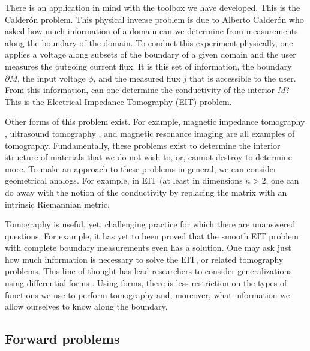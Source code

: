 There is an application in mind with the toolbox we have developed. This is the Calder\'on problem. This physical inverse problem is due to  Alberto Calder\'on who asked how much information of a domain can we determine from measurements along the boundary of the domain. To conduct this experiment physically, one applies a voltage along subsets of the boundary of a given domain and the user measures the outgoing current flux. It is this set of information, the boundary $\partial M$, the input voltage $\phi$, and the measured flux $j$ that is accessible to the user. From this information, can one determine the conductivity of the interior $M$? This is the Electrical Impedance Tomography (EIT) problem. 

Other forms of this problem exist. For example, magnetic impedance tomography , ultrasound tomography , and magnetic resonance imaging are all examples of tomography.  Fundamentally, these problems exist to determine the interior structure of materials that we do not wish to, or, cannot destroy to determine more. To make an approach to these problems in general, we can consider geometrical analogs. For example, in EIT (at least in dimensions $n>2$, one can do away with the notion of the conductivity by replacing the matrix with an intrinsic Riemannian metric. 

Tomography is useful, yet, challenging practice for which there are unanswered questions. For example, it has yet to been proved that the smooth EIT problem with complete boundary measurements even has a solution.  One may ask just how much information is necessary to solve the EIT, or related tomography problems. This line of thought has lead researchers to consider generalizations using differential forms . Using forms, there is less restriction on the types of functions we use to perform tomography and, moreover, what information we allow ourselves to know along the boundary. 

\subsection{Forward problems}

